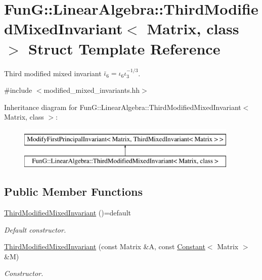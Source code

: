 \hypertarget{structFunG_1_1LinearAlgebra_1_1ThirdModifiedMixedInvariant}{\section{Fun\-G\-:\-:Linear\-Algebra\-:\-:Third\-Modified\-Mixed\-Invariant$<$ Matrix, class $>$ Struct Template Reference}
\label{structFunG_1_1LinearAlgebra_1_1ThirdModifiedMixedInvariant}
}


Third modified mixed invariant $\bar\iota_6=\iota_6\iota_3^{-1/3}$.  




{\ttfamily \#include $<$modified\-\_\-mixed\-\_\-invariants.\-hh$>$}

Inheritance diagram for Fun\-G\-:\-:Linear\-Algebra\-:\-:Third\-Modified\-Mixed\-Invariant$<$ Matrix, class $>$\-:\begin{figure}[H]
\begin{center}
\leavevmode
\includegraphics[height=2.000000cm]{structFunG_1_1LinearAlgebra_1_1ThirdModifiedMixedInvariant}
\end{center}
\end{figure}
\subsection*{Public Member Functions}
\begin{DoxyCompactItemize}
\item 
\hypertarget{structFunG_1_1LinearAlgebra_1_1ThirdModifiedMixedInvariant_a44fcdc90fe9fa76e7f803da8d07e57aa}{\hyperlink{structFunG_1_1LinearAlgebra_1_1ThirdModifiedMixedInvariant_a44fcdc90fe9fa76e7f803da8d07e57aa}{Third\-Modified\-Mixed\-Invariant} ()=default}\label{structFunG_1_1LinearAlgebra_1_1ThirdModifiedMixedInvariant_a44fcdc90fe9fa76e7f803da8d07e57aa}

\begin{DoxyCompactList}\small\item\em Default constructor. \end{DoxyCompactList}\item 
\hyperlink{structFunG_1_1LinearAlgebra_1_1ThirdModifiedMixedInvariant_ad52e10528d4d2197dd3a09ec42e9d1f0}{Third\-Modified\-Mixed\-Invariant} (const Matrix \&A, const \hyperlink{structFunG_1_1Constant}{Constant}$<$ Matrix $>$ \&M)
\begin{DoxyCompactList}\small\item\em Constructor. \end{DoxyCompactList}\end{DoxyCompactItemize}


